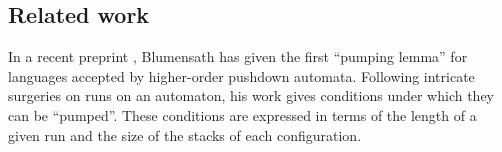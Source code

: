 %

\subsection*{Related work}
In a recent preprint \cite{Blu04}, Blumensath has given the first
``pumping lemma'' for languages accepted by higher-order pushdown
automata. Following intricate surgeries on runs on an automaton, his
work gives conditions under which they can be ``pumped''. These
conditions are expressed in terms of the length of a given run and the
size of the stacks of each configuration.
